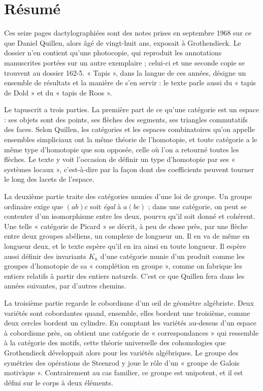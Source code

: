 \documentclass[11pt,a4paper]{article}
\begin{document}
\section*{Résumé}

\begin{resume}
Ces seize pages dactylographiées sont des notes prises en septembre 1968 sur ce
que Daniel Quillen, alors âgé de vingt-huit ans, exposait à Grothendieck. Le
dossier n'en contient qu'une photocopie, qui reproduit les annotations
manuscrites portées sur un autre exemplaire ; celui-ci et une seconde copie se
trouvent au dossier 162-5. « Tapis », dans la
langue de ces années, désigne un ensemble de résultats et la manière de s'en
servir : le texte parle aussi du « tapis de Dold » et du « tapis de Roos ».

Le tapuscrit a trois parties. La première part de ce qu'une catégorie est un
espace : ses objets sont des points, ses flèches des segments, ses triangles
commutatifs des faces. Selon Quillen, les catégories et les espaces
combinatoires qu'on appelle ensembles simpliciaux ont la même théorie de
l'homotopie, et toute catégorie a le même type d'homotopie que son opposée,
celle où l'on a retourné toutes les flèches. Le texte y voit l'occasion de
définir un type d'homotopie par ses « systèmes locaux », c'est-à-dire par la
façon dont des coefficients peuvent tourner le long des lacets de l'espace.

La deuxième partie traite des catégories munies d'une loi de groupe. Un groupe
ordinaire exige que $(ab)c$ soit \emph{égal} à $a(bc)$ ; dans une catégorie, on
peut se contenter d'un isomorphisme entre les deux, pourvu qu'il soit donné et
cohérent. Une telle « catégorie de Picard » se décrit, à peu de chose près, par
une flèche entre deux groupes abéliens, un complexe de longueur un. Il en va de
même en longueur deux, et le texte espère qu'il en ira ainsi en toute longueur.
Il espère aussi définir des invariants $K_n$ d'une catégorie munie d'un produit
comme les groupes d'homotopie de sa « complétion en groupe », comme on fabrique
les entiers relatifs à partir des entiers naturels. C'est ce que Quillen fera
dans les années suivantes, par d'autres chemins.

La troisième partie regarde le cobordisme d'un œil de géomètre algébriste. Deux
variétés sont cobordantes quand, ensemble, elles bordent une troisième, comme
deux cercles bordent un cylindre. En comptant les variétés au-dessus d'un espace
à cobordisme près, on obtient une catégorie de « correspondances » qui ressemble
à la catégorie des motifs, cette théorie universelle des cohomologies que
Grothendieck développait alors pour les variétés algébriques. Le groupe des
symétries des opérations de Steenrod y joue le rôle d'un « groupe de Galois
motivique ». Contrairement au cas familier, ce groupe est unipotent, et il est
défini sur le corps à deux éléments.


\end{resume}
\end{document}
